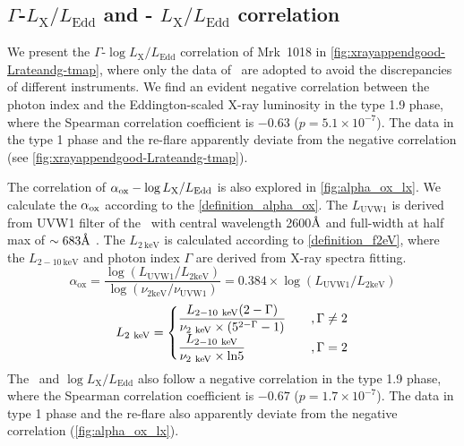 

\subsection{$\Gamma$-$L_\mathrm{X}/L_\mathrm{Edd}$ and \alphaox- $L_\mathrm{X}/L_\mathrm{Edd}$ correlation}\label{subsec:xray-uv}
We present the $\Gamma$-$\log{L_\mathrm{X}/L_\mathrm{Edd}}$ correlation of Mrk~1018 in \autoref{fig:xrayappendgood-Lrateandg-tmap}, where only the data of \xrt\, are adopted to avoid the discrepancies of different instruments. We find an evident negative correlation between the photon index and the Eddington-scaled X-ray luminosity in the type 1.9 phase, where the Spearman correlation coefficient is $-0.63$ ($p=5.1\times10^{-7}$). The data in the type 1 phase and the re-flare apparently deviate from the negative correlation (see \autoref{fig:xrayappendgood-Lrateandg-tmap}). 

The correlation of $\alpha_{\rm ox}-\log{L_\mathrm{X}/L_\mathrm{Edd}}$ is also explored in \autoref{fig:alpha_ox_lx}. We calculate the $\alpha_{\rm ox}$ according to the \autoref{definition_alpha_ox}. The $L_\mathrm{UVW1}$ is derived from UVW1 filter of the \uvot\ with central wavelength {2600{$\text{\normalfont\AA}$}} and full-width at half max of $\sim 683\text{\normalfont\AA}$ \citep{2008MNRAS.383..627P}. The $L_\mathrm{2~ keV}$ is calculated according to \autoref{definition_f2eV}, where the $L_\mathrm{2-10~ keV}$ and photon index $\Gamma$ are derived from X-ray spectra fitting. 
\begin{equation}
\alpha_\mathrm{ox} = \frac{\log (L_\mathrm{UVW1} / L_\mathrm{2keV} )} {\log (\nu_\mathrm{2keV} /  \nu_\mathrm{UVW1} )}=0.384\times {\log (L_\mathrm{UVW1} / L_\mathrm{2keV} )}
\label{definition_alpha_ox}
\end{equation}
\begin{eqnarray}
\large{
L_\mathrm{2~keV}= 
\begin{cases}\displaystyle\frac{L_\mathrm{2-10~ keV} (2-\Gamma)}{\nu_\mathrm{2~keV} \times (5^{2-\Gamma}-1)} \quad &, 
\Gamma \neq 2 \\ 
\displaystyle\frac{L_\mathrm{2-10~ keV}}{\nu_\mathrm{2~keV} \times \mathrm{ln} 5}\quad  &, \Gamma = 2
\end{cases} }
\label{definition_f2eV}
\end{eqnarray} 
The \alphaox\, and $\log{L_\mathrm{X}/L_\mathrm{Edd}}$ also follow a negative correlation in the type 1.9 phase, where the Spearman correlation coefficient is $-0.67$ ($p=1.7\times10^{-7}$). The data in type 1 phase and the re-flare also apparently deviate from the negative correlation (\autoref{fig:alpha_ox_lx}).
 
